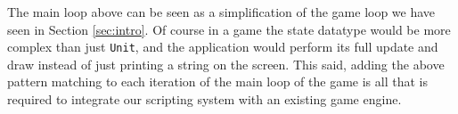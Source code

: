The main loop above can be seen as a simplification of the game loop we have seen in Section \ref{sec:intro}. Of course in a game the state datatype would be more complex than just \texttt{Unit}, and the application would perform its full update and draw instead of just printing a string on the screen. This said, adding the above pattern matching to each iteration of the main loop of the game is all that is required to integrate our scripting system with an existing game engine.

